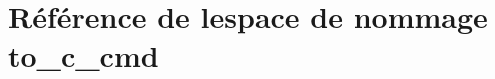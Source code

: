 \hypertarget{namespaceto__c__cmd}{}\section{Référence de l\textquotesingle{}espace de nommage to\+\_\+c\+\_\+cmd}
\label{namespaceto__c__cmd}
